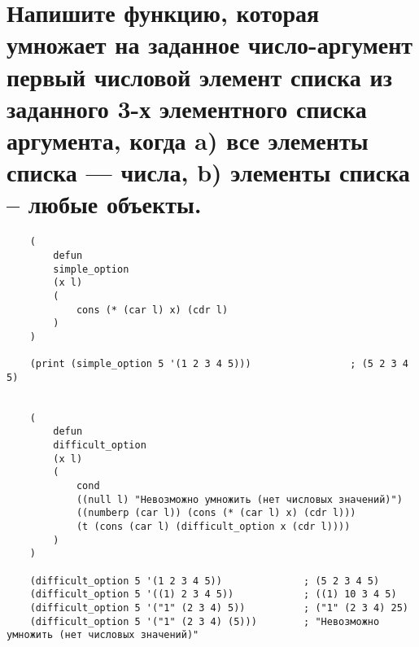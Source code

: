 \section{Напишите функцию, которая умножает на заданное число-аргумент
первый числовой элемент списка из заданного 3-х элементного списка аргумента, когда a) все элементы списка --- числа, b) элементы списка -- любые объекты.}

\begin{lstlisting}
    (
        defun
        simple_option
        (x l)
        (
            cons (* (car l) x) (cdr l)
        )
    )
    
    (print (simple_option 5 '(1 2 3 4 5)))                 ; (5 2 3 4 5) 

    
    (
        defun
        difficult_option
        (x l)
        (
            cond 
            ((null l) "Невозможно умножить (нет числовых значений)")
            ((numberp (car l)) (cons (* (car l) x) (cdr l)))
            (t (cons (car l) (difficult_option x (cdr l))))
        )
    )
    
    (difficult_option 5 '(1 2 3 4 5))              ; (5 2 3 4 5) 
    (difficult_option 5 '((1) 2 3 4 5))            ; ((1) 10 3 4 5) 
    (difficult_option 5 '("1" (2 3 4) 5))          ; ("1" (2 3 4) 25) 
    (difficult_option 5 '("1" (2 3 4) (5)))        ; "Невозможно умножить (нет числовых значений)"

\end{lstlisting}
